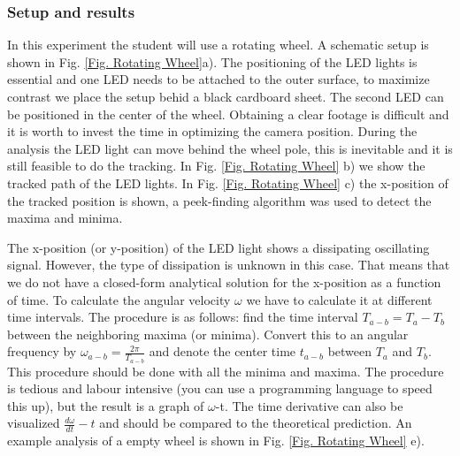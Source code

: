 \documentclass{article}
\begin{document}
\subsubsection{Setup and results}
In this experiment the student will use a rotating wheel. A schematic setup is shown in Fig. \ref{Fig. Rotating Wheel}a). The positioning of the LED lights is essential and one LED needs to be attached to the outer surface, to maximize contrast we place the setup behid a black cardboard sheet. The second LED can be positioned in the center of the wheel. Obtaining a clear footage is difficult and it is worth to invest the time in optimizing the camera position. During the analysis the LED light can move behind the wheel pole, this is inevitable and it is still feasible to do the tracking. In Fig. \ref{Fig. Rotating Wheel} b) we show the tracked path of the LED lights. In Fig. \ref{Fig. Rotating Wheel} c) the x-position of the tracked position is shown, a peek-finding algorithm was used to detect the maxima and minima.

The x-position (or y-position) of the LED light shows a dissipating oscillating signal. However, the type of dissipation is unknown in this case. That means that we do not have a closed-form analytical solution for the x-position as a function of time. To calculate the angular velocity $\omega$ we have to calculate it at different time intervals. The procedure is as follows: find the time interval $T_{a-b}=T_a-T_b$ between the neighboring maxima (or minima). Convert this to an angular frequency by $\omega_{a-b} = \frac{2\pi}{T_{a-b}}$ and denote the center time $t_{a-b}$ between $T_a$ and $T_b$. This procedure should be done with all the minima and maxima. The procedure is tedious and labour intensive (you can use a programming language to speed this up), but the result is a graph of $\omega$-t. The time derivative can also be visualized $\frac{d\omega}{dt}-t$ and should be compared to the theoretical prediction. An example analysis of a empty wheel is shown in Fig. \ref{Fig. Rotating Wheel} e).
\end{document}
